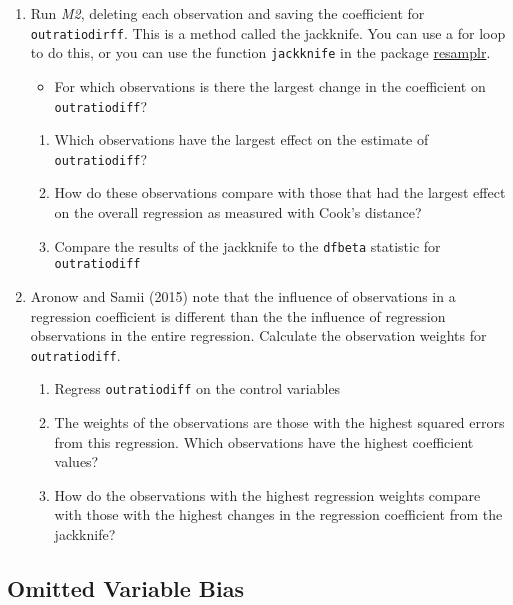 \documentclass[]{article}
\providecommand{\tightlist}{%
  \setlength{\itemsep}{0pt}\setlength{\parskip}{0pt}}
\begin{document}
\begin{enumerate}
\def\labelenumi{\arabic{enumi}.}
\item
  Run \emph{M2}, deleting each observation and saving the coefficient
  for \texttt{outratiodirff}. This is a method called the jackknife. You
  can use a for loop to do this, or you can use the function
  \texttt{jackknife} in the package
  \href{https://github.com/jrnold/resamplr}{resamplr}.

  \begin{itemize}
  \tightlist
  \item
    For which observations is there the largest change in the
    coefficient on \texttt{outratiodiff}?
  \end{itemize}

  \begin{enumerate}
  \def\labelenumii{\arabic{enumii}.}
  \tightlist
  \item
    Which observations have the largest effect on the estimate of
    \texttt{outratiodiff}?
  \item
    How do these observations compare with those that had the largest
    effect on the overall regression as measured with Cook's distance?
  \item
    Compare the results of the jackknife to the \texttt{dfbeta}
    statistic for \texttt{outratiodiff}
  \end{enumerate}
\item
  Aronow and Samii (2015) note that the influence of observations in a
  regression coefficient is different than the the influence of
  regression observations in the entire regression. Calculate the
  observation weights for \texttt{outratiodiff}.

  \begin{enumerate}
  \def\labelenumii{\arabic{enumii}.}
  \tightlist
  \item
    Regress \texttt{outratiodiff} on the control variables
  \item
    The weights of the observations are those with the highest squared
    errors from this regression. Which observations have the highest
    coefficient values?
  \item
    How do the observations with the highest regression weights compare
    with those with the highest changes in the regression coefficient
    from the jackknife?
  \end{enumerate}
\end{enumerate}

\subsection{Omitted Variable Bias}\label{omitted-variable-bias}
\end{document}
